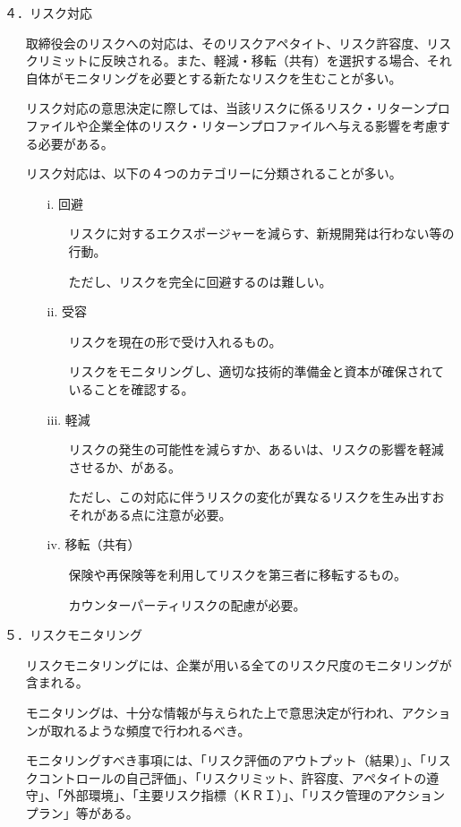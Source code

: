 \documentclass[report,gutter=10mm,fore-edge=10mm,uplatex,dvipdfmx]{jlreq}
\begin{document}
４．リスク対応
\begin{itemize}
\item[] 取締役会のリスクへの対応は、そのリスクアペタイト、リスク許容度、リスクリミットに反映される。また、軽減・移転（共有）を選択する場合、それ自体がモニタリングを必要とする新たなリスクを生むことが多い。
\item[] リスク対応の意思決定に際しては、当該リスクに係るリスク・リターンプロファイルや企業全体のリスク・リターンプロファイルへ与える影響を考慮する必要がある。
\item[] リスク対応は、以下の４つのカテゴリーに分類されることが多い。
\begin{itemize}
\item[i.] 回避
\begin{itemize}
\item[] リスクに対するエクスポージャーを減らす、新規開発は行わない等の行動。
\item[] ただし、リスクを完全に回避するのは難しい。
\end{itemize}
\item[ii.] 受容
\begin{itemize}
\item[] リスクを現在の形で受け入れるもの。
\item[] リスクをモニタリングし、適切な技術的準備金と資本が確保されていることを確認する。
\end{itemize}
\item[iii.] 軽減
\begin{itemize}
\item[] リスクの発生の可能性を減らすか、あるいは、リスクの影響を軽減させるか、がある。
\item[] ただし、この対応に伴うリスクの変化が異なるリスクを生み出すおそれがある点に注意が必要。
\end{itemize}
\item[iv.] 移転（共有）
\begin{itemize}
\item[] 保険や再保険等を利用してリスクを第三者に移転するもの。
\item[] カウンターパーティリスクの配慮が必要。
\end{itemize}
\end{itemize}
\end{itemize}

５．リスクモニタリング
\begin{itemize}
\item[] リスクモニタリングには、企業が用いる全てのリスク尺度のモニタリングが含まれる。
\item[] モニタリングは、十分な情報が与えられた上で意思決定が行われ、アクションが取れるような頻度で行われるべき。
\item[] モニタリングすべき事項には、「リスク評価のアウトプット（結果）」、「リスクコントロールの自己評価」、「リスクリミット、許容度、アペタイトの遵守」、「外部環境」、「主要リスク指標（ＫＲＩ）」、「リスク管理のアクションプラン」等がある。
\end{itemize}
\end{document}
